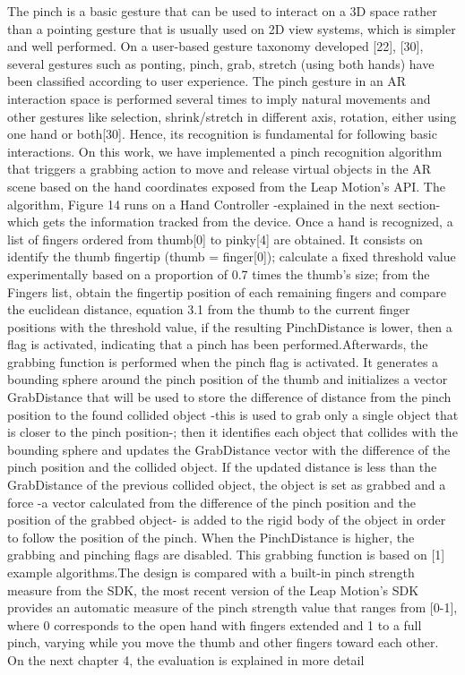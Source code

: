The pinch is a basic gesture that can be used to interact on a 3D space rather than a pointing gesture that is usually used on 2D view systems, which is simpler and well performed. On a user-based gesture taxonomy developed [22], [30], several gestures such as ponting, pinch, grab, stretch (using both hands) have been classified according to user experience. The pinch gesture in an AR interaction space is performed several times to imply natural movements and other gestures like selection, shrink/stretch in different axis, rotation, either using one hand or both[30]. Hence, its recognition is fundamental for following basic interactions. On this work, we have implemented a pinch recognition algorithm that triggers a grabbing action to move and release virtual objects in the AR scene based on the hand coordinates exposed from the Leap Motion’s API. The algorithm, Figure 14 runs on a Hand Controller -explained in the next section- which gets the information tracked from the device. Once a hand is recognized, a list of fingers ordered from thumb[0] to pinky[4] are obtained. It consists on identify the thumb fingertip (thumb = finger[0]); calculate a fixed threshold value experimentally based on a proportion of 0.7 times the thumb’s size; from the Fingers list, obtain the fingertip position of each remaining fingers and compare the euclidean distance, equation 3.1 from the thumb to the current finger positions with the threshold value, if the resulting PinchDistance is lower, then a flag is activated, indicating that a pinch has been performed.Afterwards, the grabbing function is performed when the pinch flag is activated. It generates a bounding sphere around the pinch position of the thumb and initializes a vector GrabDistance that will be used to store the difference of distance from the pinch position to the found collided object -this is used to grab only a single object that is closer to the pinch position-; then it identifies each object that collides with the bounding sphere and updates the GrabDistance vector with the difference of the pinch position and the collided object. If the updated distance is less than the GrabDistance of the previous collided object, the object is set as grabbed and a force -a vector calculated from the difference of the pinch position and the position of the grabbed object- is added to the rigid body of the object in order to follow the position of the pinch. When the PinchDistance is higher, the grabbing and pinching flags are disabled. This grabbing function is based on [1] example algorithms.The design is compared with a built-in pinch strength measure from the SDK, the most recent version of the Leap Motion’s SDK provides an automatic measure of the pinch strength value that ranges from [0-1], where 0 corresponds to the open hand with fingers extended and 1 to a full pinch, varying while you move the thumb and other fingers toward each other. On the next chapter 4, the evaluation is explained in more detail



